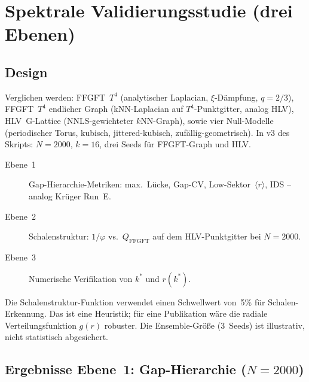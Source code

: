 \section{Spektrale Validierungsstudie (drei Ebenen)}

\subsection{Design}

Verglichen werden: FFGFT~$T^4$ (analytischer Laplacian, $\xi$-Dämpfung,
$q=2/3$), FFGFT~$T^4$ endlicher Graph (kNN-Laplacian auf $T^4$-Punktgitter,
analog HLV), HLV~G-Lattice (NNLS-gewichteter $k$NN-Graph), sowie vier
Null-Modelle (periodischer Torus, kubisch, jittered-kubisch,
zufällig-geometrisch). In v3 des Skripts: $N=2000$, $k=16$, drei Seeds
für FFGFT-Graph und HLV.

\begin{description}
  \item[Ebene~1] Gap-Hierarchie-Metriken: max.\ Lücke, Gap-CV,
    Low-Sektor~$\langle r\rangle$, IDS -- analog Krüger Run~E.
  \item[Ebene~2] Schalenstruktur: $1/\varphi$ vs.\ $Q_\mathrm{FFGFT}$
    auf dem HLV-Punktgitter bei $N=2000$.
  \item[Ebene~3] Numerische Verifikation von $k^*$ und $r(k^*)$.
\end{description}

\begin{remark}
Die Schalenstruktur-Funktion verwendet einen Schwellwert von~5\% für
Schalen-Erkennung. Das ist eine Heuristik; für eine Publikation wäre
die radiale Verteilungsfunktion $g(r)$ robuster. Die Ensemble-Größe
(3~Seeds) ist illustrativ, nicht statistisch abgesichert.
\end{remark}

\subsection{Ergebnisse Ebene~1: Gap-Hierarchie ($N=2000$)}

